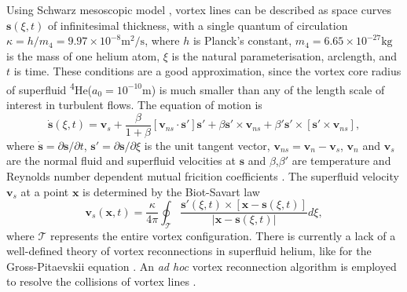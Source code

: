\documentclass[%
 amsmath,amssymb,
 aps,
prl,
]{revtex4-2}
\def \s{\mathbf{s}}
\def \v{\mathbf{v}}
\def \x{\mathbf{x}}
\begin{document}
Using Schwarz mesoscopic model \cite{schwarzThreedimensionalVortexDynamics1988a}, vortex lines can be described as space curves $\s(\xi,t)$ of infinitesimal thickness, with a single quantum of circulation $\kappa=h/m_4=9.97\times10^{-8}\text{m}^2/\text{s}$, where $h$ is Planck's constant, $m_4=6.65\times10^{-27}\text{kg}$ is the mass of one helium atom, $\xi$ is the natural parameterisation, arclength, and $t$ is time. These conditions are a good approximation, since the vortex core radius of superfluid \textsuperscript{4}He($a_0=10^{-10}\text{m}$) is much smaller than any of the length scale of interest in turbulent flows. The equation of motion is
\begin{equation}
	\dot{\s}(\xi,t) = \v_s + \frac{\beta}{1+\beta}\left[\v_{ns}\cdot \s'\right]\s' + \beta\s'\times\v_{ns}+\beta'\s'\times\left[\s'\times \v_{ns}\right],
\end{equation}
where $\dot{\s}=\partial\s/\partial t$, $\s'=\partial\s/\partial \xi$ is the unit tangent vector, $\v_{ns}=\v_n - \v_s$, $\v_n$ and $\v_s$ are the normal fluid and superfluid velocities at $\s$ and $\beta$,$\beta'$ are temperature and Reynolds number dependent mutual fricition coefficients \cite{galantucciNewSelfconsistentApproach2020b}. The superfluid velocity $\v_s$ at a point $\x$ is determined by the Biot-Savart law
\begin{equation}
	\v_s(\x,t) = \frac{\kappa}{4\pi}\oint_{\mathcal{T}}\frac{\s'(\xi,t)\times\left[\x-\s(\xi,t)\right]}{|\x-\s(\xi,t)|}d\xi,
\end{equation}
where $\mathcal{T}$ represents the entire vortex configuration.
There is currently a lack of a well-defined theory of vortex reconnections in superfluid helium, like for the Gross-Pitaevskii equation \cite{villoisIrreversibleDynamicsVortex2020,villoisUniversalNonuniversalAspects2017a,promentMatchingTheoryCharacterize2020a}. An \emph{ad hoc} vortex reconnection algorithm is employed to resolve the collisions of vortex lines \cite{baggaleySensitivityVortexFilament2012a}.
\end{document}
